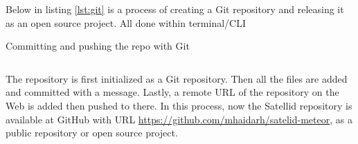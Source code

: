 Below in listing \autoref{lst:git} is a process of creating a Git repository and releasing it as an open source project.
All done within terminal/\ac{CLI}

\begin{listing}[!h]
\caption{Committing and pushing the repo with Git}
\inputminted{shell-session}{\dir/include/git.shell-session}
\label{lst:git}
\end{listing}

The repository is first initialized as a Git repository.
Then all the files are added and committed with a message.
Lastly, a remote \ac{URL} of the repository on the Web is added then pushed to there.
In this process, now the Satellid repository is available at GitHub with \ac{URL} \url{https://github.com/mhaidarh/satelid-meteor}, as a public repository or open source project.
